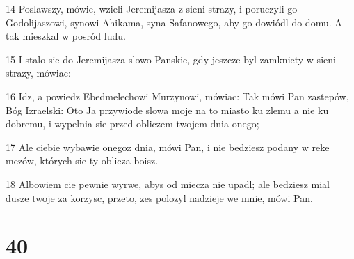 \par 14 Poslawszy, mówie, wzieli Jeremijasza z sieni strazy, i poruczyli go Godolijaszowi, synowi Ahikama, syna Safanowego, aby go dowiódl do domu. A tak mieszkal w posród ludu.
\par 15 I stalo sie do Jeremijasza slowo Panskie, gdy jeszcze byl zamkniety w sieni strazy, mówiac:
\par 16 Idz, a powiedz Ebedmelechowi Murzynowi, mówiac: Tak mówi Pan zastepów, Bóg Izraelski: Oto Ja przywiode slowa moje na to miasto ku zlemu a nie ku dobremu, i wypelnia sie przed obliczem twojem dnia onego;
\par 17 Ale ciebie wybawie onegoz dnia, mówi Pan, i nie bedziesz podany w reke mezów, których sie ty oblicza boisz.
\par 18 Albowiem cie pewnie wyrwe, abys od miecza nie upadl; ale bedziesz mial dusze twoje za korzysc, przeto, zes polozyl nadzieje we mnie, mówi Pan.

\chapter{40}

